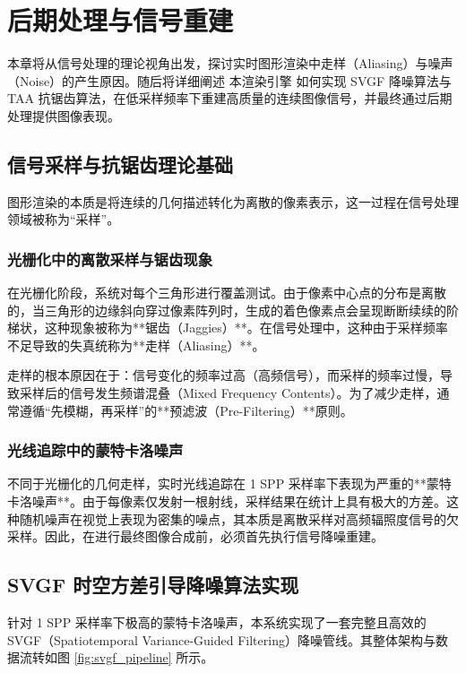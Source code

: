 
\chapter{后期处理与信号重建}
\label{sec:post_processing}

本章将从信号处理的理论视角出发，探讨实时图形渲染中走样（Aliasing）与噪声（Noise）的产生原因。随后将详细阐述 本渲染引擎 如何实现 SVGF 降噪算法与 TAA 抗锯齿算法，在低采样频率下重建高质量的连续图像信号，并最终通过后期处理提供图像表现。

\section{信号采样与抗锯齿理论基础}

图形渲染的本质是将连续的几何描述转化为离散的像素表示，这一过程在信号处理领域被称为“采样”。

\subsection{光栅化中的离散采样与锯齿现象}
在光栅化阶段，系统对每个三角形进行覆盖测试。由于像素中心点的分布是离散的，当三角形的边缘斜向穿过像素阵列时，生成的着色像素点会呈现断断续续的阶梯状，这种现象被称为**锯齿（Jaggies）**。在信号处理中，这种由于采样频率不足导致的失真统称为**走样（Aliasing）**。

走样的根本原因在于：信号变化的频率过高（高频信号），而采样的频率过慢，导致采样后的信号发生频谱混叠（Mixed Frequency Contents）。为了减少走样，通常遵循“先模糊，再采样”的**预滤波（Pre-Filtering）**原则。

\subsection{光线追踪中的蒙特卡洛噪声}
不同于光栅化的几何走样，实时光线追踪在 1 SPP 采样率下表现为严重的**蒙特卡洛噪声**。由于每像素仅发射一根射线，采样结果在统计上具有极大的方差。这种随机噪声在视觉上表现为密集的噪点，其本质是离散采样对高频辐照度信号的欠采样。因此，在进行最终图像合成前，必须首先执行信号降噪重建。

\section{SVGF 时空方差引导降噪算法实现}

针对 1 SPP 采样率下极高的蒙特卡洛噪声，本系统实现了一套完整且高效的 SVGF（Spatiotemporal Variance-Guided Filtering）降噪管线。其整体架构与数据流转如图 \ref{fig:svgf_pipeline} 所示。

